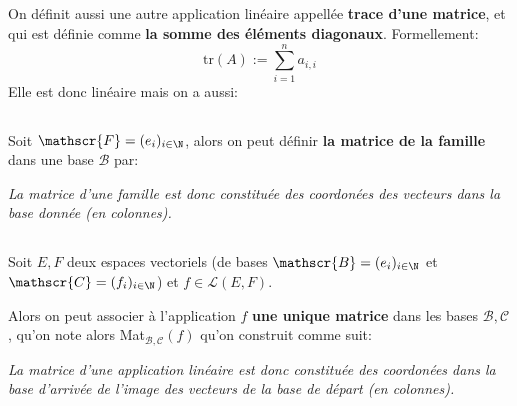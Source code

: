 \subsection*{}

On définit aussi une autre application linéaire appellée \textbf{trace d'une matrice}, et qui est définie comme \textbf{la somme des éléments diagonaux}. Formellement:
\[
   \text{tr}(A) := \sum_{i=1}^{n} a_{i, i}   
\]
Elle est donc linéaire mais on a aussi:


\subsection*{}

Soit \(\mathscr{F} = (e_i)_{i\in\N}\), alors on peut définir \textbf{la matrice de la famille} dans une base \(\mathscr{B}\) par:

\begin{center}
   \textit{
      La matrice d'une famille est donc constituée des coordonées des vecteurs\+
      dans la base donnée (en colonnes).
   }
\end{center}
\pagebreak

\subsection*{}

Soit \(E, F\) deux espaces vectoriels (de bases \(\mathscr{B} = (e_i)_{i \in \N}\) et \(\mathscr{C}=(f_i)_{i \in \N}\)) et \(f \in \mathcal{L}(E, F)\).\<

Alors on peut associer à l'application \(f\) \textbf{une unique matrice} dans les bases \(\mathscr{B, C}\), qu'on note alors Mat\(_{\mathscr{B, C}}(f)\) qu'on construit comme suit:
\begin{center}
   \textit{
      La matrice d'une application linéaire est donc constituée des coordonées dans la base d'arrivée de l'image des vecteurs de la base de départ (en colonnes).
   }
\end{center}

